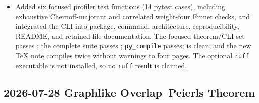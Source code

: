 \begin{itemize}
with SHA256 prefix \texttt{} and
\texttt{}
with prefix \texttt{}.  Independent reruns were
byte-identical.  Recorded runtimes were approximately \(0.15\) and \(2.29\)
seconds on one CPU, with pair-count, elapsed-time, and ETA progress.
\item Added six focused profiler test functions (14 pytest cases), including
exhaustive Chernoff-majorant and correlated weight-four Finner checks, and
integrated the CLI into package, command, architecture, reproducibility,
README, and retained-file documentation.  The focused theorem/CLI set passes
\texttt{}; the complete suite passes
\texttt{}; \texttt{py\_compile} passes;
\texttt{} is clean; and the new TeX note compiles
twice without warnings to four pages.  The optional \texttt{ruff} executable
is not installed, so no \texttt{ruff} result is claimed.
\end{itemize}

\subsection*{2026-07-28 Graphlike Overlap--Peierls Theorem}

